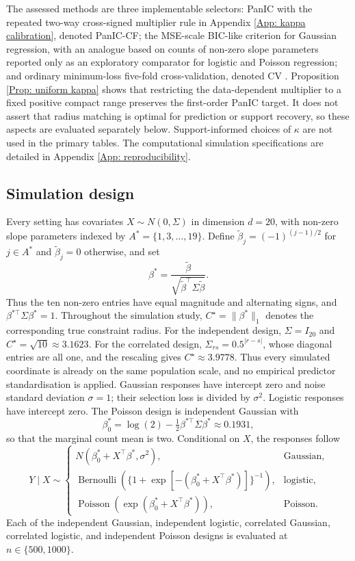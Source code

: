 \documentclass[12pt]{article}
\newenvironment{bluechange}{\begingroup\color[rgb]{0.00,0.00,1.00}}{\endgroup}
\theoremstyle{remark}
\theoremstyle{plain}
\begin{document}
\begin{bluechange}
The assessed methods are three implementable selectors: PanIC with the repeated two-way cross-signed multiplier rule in Appendix \ref{App: kappa calibration}, denoted PanIC-CF; the MSE-scale BIC-like criterion for Gaussian regression, with an analogue based on counts of non-zero slope parameters reported only as an exploratory comparator for logistic and Poisson regression; and ordinary minimum-loss five-fold cross-validation, denoted CV \citep{stone_cross-validatory_1974,hastie_elements_2009}. Proposition \ref{Prop: uniform kappa} shows that restricting the data-dependent multiplier to a fixed positive compact range preserves the first-order PanIC target. It does not assert that radius matching is optimal for prediction or support recovery, so these aspects are evaluated separately below. Support-informed choices of $\kappa$ are not used in the primary tables. The computational simulation specifications are detailed in Appendix \ref{App: reproducibility}.

\subsection{Simulation design}\label{Sect: Linear regression}
Every setting has covariates $X\sim N(0,\Sigma)$ in dimension $d=20$, with non-zero slope parameters indexed by $A^*=\{1,3,\ldots,19\}$. Define $\widetilde\beta_j=(-1)^{(j-1)/2}$ for $j\in A^*$ and $\widetilde\beta_j=0$ otherwise, and set
\[
\beta^*=\frac{\widetilde\beta}{\sqrt{\widetilde\beta^\top\Sigma\widetilde\beta}}.
\]
Thus the ten non-zero entries have equal magnitude and alternating signs, and $\beta^{*\top}\Sigma\beta^*=1$. Throughout the simulation study, $C^\star=\|\beta^*\|_1$ denotes the corresponding true constraint radius. For the independent design, $\Sigma=I_{20}$ and $C^\star=\sqrt{10}\approx3.1623$. For the correlated design, $\Sigma_{rs}=0.5^{|r-s|}$, whose diagonal entries are all one, and the rescaling gives $C^\star\approx3.9778$. Thus every simulated coordinate is already on the same population scale, and no empirical predictor standardisation is applied. Gaussian responses have intercept zero and noise standard deviation $\sigma=1$; their selection loss is divided by $\sigma^2$. Logistic responses have intercept zero. The Poisson design is independent Gaussian with
\[
\beta_0^*=\log(2)-\tfrac12\beta^{*\top}\Sigma\beta^*\approx0.1931,
\]
so that the marginal count mean is two. Conditional on $X$, the responses follow
\[
Y\mid X\sim
\begin{cases}
N(\beta_0^*+X^\top\beta^*,\sigma^2),&\text{Gaussian},\\
\operatorname{Bernoulli}\!\left(\{1+\exp[-(\beta_0^*+X^\top\beta^*)]\}^{-1}\right),&\text{logistic},\\
\operatorname{Poisson}\!\left(\exp(\beta_0^*+X^\top\beta^*)\right),&\text{Poisson}.
\end{cases}
\]
Each of the independent Gaussian, independent logistic, correlated Gaussian, correlated logistic, and independent Poisson designs is evaluated at $n\in\{500,1000\}$.


\end{bluechange}
\end{document}
